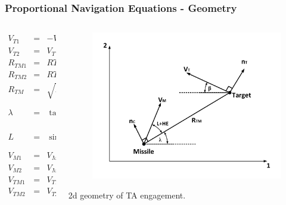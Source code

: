 \documentclass{beamer}
\begin{document}
\begin{frame}
\frametitle{Proportional Navigation Equations - Geometry}
\begin{columns}[c]
\begin{column}{.35\linewidth}
	{\footnotesize 		\begin{eqnarray}
		V_{T1} &=& - V_T \cos(\beta) \nonumber\\
		V_{T2} &=&  V_T \sin(\beta) \nonumber\\
		R_{TM1} &=& R{T1} - R_{M1}\nonumber\\
		R_{TM2} &=& R{T2} - R_{M2}\nonumber\\
		R_{TM} &=& \sqrt{R_{TM1}^2 + R_{TM2}^2}\nonumber\\
		\lambda &=& \tan^{-1} (\dfrac{R_{TM2}}{R_{TM1}})\nonumber\\
		L &=& \sin^{-1}(\dfrac{V_T \sin(\beta + \lambda)}{V_M})\nonumber\\
		V_{M1} &=& V_M \cos (\theta + HE)\nonumber\\
		V_{M2} &=& V_M \sin (\theta + HE)\nonumber\\
		V_{TM1} &=& V_{T1} - V_{M1}\nonumber\\
		V_{TM2} &=& V_{T2} - V_{M12}\nonumber
		\end{eqnarray}}
\end{column}
\begin{column}{.6\linewidth}
	\begin{figure}[htb]
		\centering
		\includegraphics[scale = 0.25]{fig/PN.pdf}
		\label{PN}
	\end{figure}
	2d geometry of TA engagement.
\end{column}
\end{columns}
\end{frame}
\end{document}
